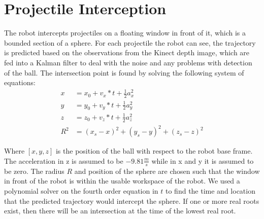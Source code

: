 \documentclass[12pt,a4paper,notitlepage]{report}
\begin{document}
\section*{Projectile Interception}
The robot intercepts projectiles on a floating window in front of it, which is
a bounded section of a sphere. For each projectile the robot can see, the trajectory is 
predicted based on the observations from the Kinect depth image, which are fed into a Kalman filter
to deal with the noise and any problems with detection of the ball. The intersection point is found by solving the following system of equations:
\begin{align*}
x &= x_0+v_x*t+\frac{1}{2}a_x^2\\
y &= y_0+v_y*t+\frac{1}{2}a_y^2\\
z &= z_0+v_z*t+\frac{1}{2}a_z^2\\
R^2 &= (x_s-x)^2+(y_s-y)^2+(z_s-z)^2
\end{align*}

Where \([x,y,z]\) is the position of the ball with respect to the robot base frame.
The acceleration in z is assumed to be \(-9.81 \frac{m}{s}\) while in x and y it
 is assumed to be zero. The radius \(R\) and position of the sphere are chosen such that the window
 in front of the robot is within the usable workspace of the robot. We used a polynomial solver 
 on the fourth order equation in \(t\) to find the time and location
  that the predicted trajectory would intercept the sphere. If one or more real roots exist, then
  there will be an intersection at the time of the lowest real root.
  
\end{document}
